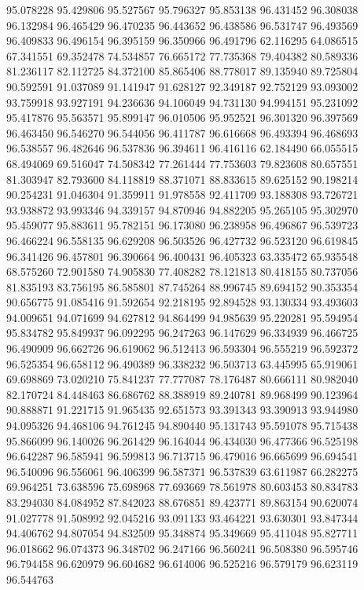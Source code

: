 95.078228
95.429806
95.527567
95.796327
95.853138
96.431452
96.308038
96.132984
96.465429
96.470235
96.443652
96.438586
96.531747
96.493569
96.409833
96.496154
96.395159
96.350966
96.491796
62.116295
64.086515
67.341551
69.352478
74.534857
76.665172
77.735368
79.404382
80.589336
81.236117
82.112725
84.372100
85.865406
88.778017
89.135940
89.725804
90.592591
91.037089
91.141947
91.628127
92.349187
92.752129
93.093002
93.759918
93.927191
94.236636
94.106049
94.731130
94.994151
95.231092
95.417876
95.563571
95.899147
96.010506
95.952521
96.301320
96.397569
96.463450
96.546270
96.544056
96.411787
96.616668
96.493394
96.468693
96.538557
96.482646
96.537836
96.394611
96.416116
62.184490
66.055515
68.494069
69.516047
74.508342
77.261444
77.753603
79.823608
80.657551
81.303947
82.793600
84.118819
88.371071
88.833615
89.625152
90.198214
90.254231
91.046304
91.359911
91.978558
92.411709
93.188308
93.726721
93.938872
93.993346
94.339157
94.870946
94.882205
95.265105
95.302970
95.459077
95.883611
95.782151
96.173080
96.238958
96.496867
96.539723
96.466224
96.558135
96.629208
96.503526
96.427732
96.523120
96.619845
96.341426
96.457801
96.390664
96.400431
96.405323
63.335472
65.935548
68.575260
72.901580
74.905830
77.408282
78.121813
80.418155
80.737056
81.835193
83.756195
86.585801
87.745264
88.996745
89.694152
90.353354
90.656775
91.085416
91.592654
92.218195
92.894528
93.130334
93.493603
94.009651
94.071699
94.627812
94.864499
94.985639
95.220281
95.594954
95.834782
95.849937
96.092295
96.247263
96.147629
96.334939
96.466725
96.490909
96.662726
96.619062
96.512413
96.593304
96.555219
96.592372
96.525354
96.658112
96.490389
96.338232
96.503713
63.445995
65.919061
69.698869
73.020210
75.841237
77.777087
78.176487
80.666111
80.982040
82.170724
84.448463
86.686762
88.388919
89.240781
89.968499
90.123964
90.888871
91.221715
91.965435
92.651573
93.391343
93.390913
93.944980
94.095326
94.468106
94.761245
94.890440
95.131743
95.591078
95.715438
95.866099
96.140026
96.261429
96.164044
96.434030
96.477366
96.525198
96.642287
96.585941
96.599813
96.713715
96.479016
96.665699
96.694541
96.540096
96.556061
96.406399
96.587371
96.537839
63.611987
66.282275
69.964251
73.638596
75.698968
77.693669
78.561978
80.603453
80.834783
83.294030
84.084952
87.842023
88.676851
89.423771
89.863154
90.620074
91.027778
91.508992
92.045216
93.091133
93.464221
93.630301
93.847344
94.406762
94.807054
94.832509
95.348874
95.349669
95.411048
95.827711
96.018662
96.074373
96.348702
96.247166
96.560241
96.508380
96.595746
96.794458
96.620979
96.604682
96.614006
96.525216
96.579179
96.623119
96.544763
